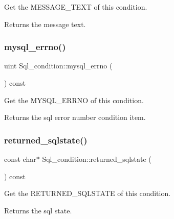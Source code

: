 Get the M\+E\+S\+S\+A\+G\+E\+\_\+\+T\+E\+XT of this condition. \begin{DoxyReturn}{Returns}
the message text. 
\end{DoxyReturn}
\mbox{\label{classSql__condition_aa66ad8bfdcabeaa941d3d5089e371525}} 
\subsubsection{\texorpdfstring{mysql\+\_\+errno()}{mysql\_errno()}}
{\footnotesize\ttfamily uint Sql\+\_\+condition\+::mysql\+\_\+errno (\begin{DoxyParamCaption}{ }\end{DoxyParamCaption}) const\hspace{0.3cm}{\ttfamily [inline]}}

Get the M\+Y\+S\+Q\+L\+\_\+\+E\+R\+R\+NO of this condition. \begin{DoxyReturn}{Returns}
the sql error number condition item. 
\end{DoxyReturn}
\mbox{\label{classSql__condition_a10c33b3c6889d6da51c7f10f95d8bf58}} 
\subsubsection{\texorpdfstring{returned\+\_\+sqlstate()}{returned\_sqlstate()}}
{\footnotesize\ttfamily const char$\ast$ Sql\+\_\+condition\+::returned\+\_\+sqlstate (\begin{DoxyParamCaption}{ }\end{DoxyParamCaption}) const\hspace{0.3cm}{\ttfamily [inline]}}

Get the R\+E\+T\+U\+R\+N\+E\+D\+\_\+\+S\+Q\+L\+S\+T\+A\+TE of this condition. \begin{DoxyReturn}{Returns}
the sql state. 
\end{DoxyReturn}
\mbox{\label{classSql__condition_ae5f2d0189912eb65a1b043f8b4db88b7}} 
